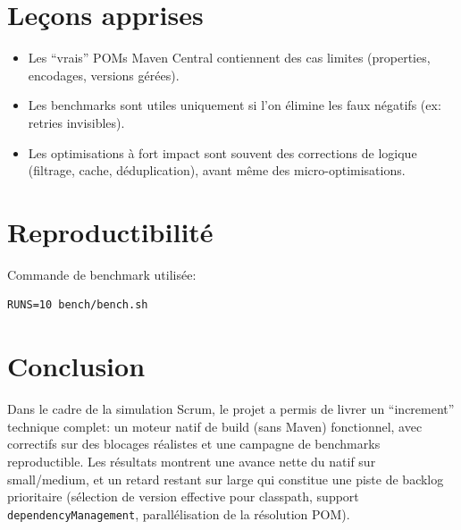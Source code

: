 \documentclass[11pt,a4paper]{article}
\begin{document}
\section{Leçons apprises}
\begin{itemize}
  \item Les ``vrais'' POMs Maven Central contiennent des cas limites (properties, encodages, versions gérées).
  \item Les benchmarks sont utiles uniquement si l’on élimine les faux négatifs (ex: retries invisibles).
  \item Les optimisations à fort impact sont souvent des corrections de logique (filtrage, cache, déduplication), avant même des micro-optimisations.
\end{itemize}

\section{Reproductibilité}
Commande de benchmark utilisée:\newline
\begin{lstlisting}
RUNS=10 bench/bench.sh
\end{lstlisting}

\section{Conclusion}
Dans le cadre de la simulation Scrum, le projet a permis de livrer un ``increment'' technique complet: un moteur natif de build (sans Maven) fonctionnel, avec correctifs sur des blocages réalistes et une campagne de benchmarks reproductible. Les résultats montrent une avance nette du natif sur small/medium, et un retard restant sur large qui constitue une piste de backlog prioritaire (sélection de version effective pour classpath, support \texttt{dependencyManagement}, parallélisation de la résolution POM).
\end{document}
